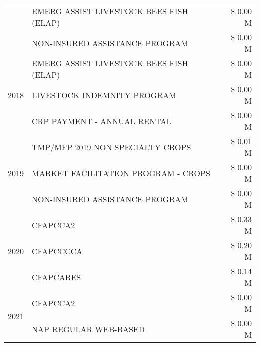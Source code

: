 \begin{tabular}{llr}
 & EMERG ASSIST LIVESTOCK BEES FISH (ELAP) & \$ 0.00 M \\
 & NON-INSURED ASSISTANCE PROGRAM & \$ 0.00 M \\
\cline{1-3}
\multirow[t]{3}{*}{2018} & EMERG ASSIST LIVESTOCK BEES FISH (ELAP) & \$ 0.00 M \\
 & LIVESTOCK INDEMNITY PROGRAM & \$ 0.00 M \\
 & CRP PAYMENT - ANNUAL RENTAL & \$ 0.00 M \\
\cline{1-3}
\multirow[t]{3}{*}{2019} & TMP/MFP 2019 NON SPECIALTY CROPS & \$ 0.01 M \\
 & MARKET FACILITATION PROGRAM - CROPS & \$ 0.00 M \\
 & NON-INSURED ASSISTANCE PROGRAM & \$ 0.00 M \\
\cline{1-3}
\multirow[t]{3}{*}{2020} & CFAPCCA2 & \$ 0.33 M \\
 & CFAPCCCCA & \$ 0.20 M \\
 & CFAPCARES & \$ 0.14 M \\
\cline{1-3}
\multirow[t]{2}{*}{2021} & CFAPCCA2 & \$ 0.00 M \\
 & NAP REGULAR WEB-BASED & \$ 0.00 M \\
\cline{1-3}
\bottomrule
\end{tabular}
